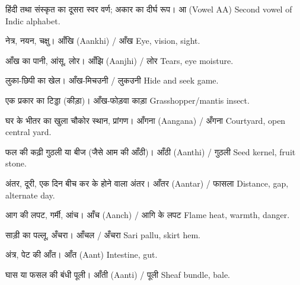 
%
{हिंदी तथा संस्कृत का दूसरा स्वर वर्ण; अकार का दीर्घ रूप।}%
{आ (Vowel AA)}%
{Second vowel of Indic alphabet.}

%
{नेत्र, नयन, चक्षु।}%
{आँखि (Aankhi) / आँख}%
{Eye, vision, sight.}

%
{आँख का पानी, आंसू, लोर।}%
{आँझि (Aanjhi) / लोर}%
{Tears, eye moisture.}

%
{लुका-छिपी का खेल।}%
{आँख-मिचउनी / लुकउनी}%
{Hide and seek game.}

%
{एक प्रकार का टिड्डा (कीड़ा)।}%
{आँख-फोड़वा काड़ा}%
{Grasshopper/mantis insect.}

%
{घर के भीतर का खुला चौकोर स्थान, प्रांगण।}%
{आँगना (Aangana) / अँगना}%
{Courtyard, open central yard.}

%
{फल की कढ़ी गुठली या बीज (जैसे आम की आँठी)।}%
{आँठी (Aanthi) / गुठली}%
{Seed kernel, fruit stone.}

%
{अंतर, दूरी, एक दिन बीच कर के होने वाला अंतर।}%
{आँतर (Aantar) / फासला}%
{Distance, gap, alternate day.}

%
{आग की लपट, गर्मी, आंच।}%
{आँच (Aanch) / आगि के लपट}%
{Flame heat, warmth, danger.}

%
{साड़ी का पल्लू, अँचरा।}%
{आँचल / अँचरा}%
{Sari pallu, skirt hem.}

%
{अंत्र, पेट की आँत।}%
{आँत (Aant)}%
{Intestine, gut.}

%
{घास या फसल की बंधी पूली।}%
{आँती (Aanti) / पूली}%
{Sheaf bundle, bale.}

